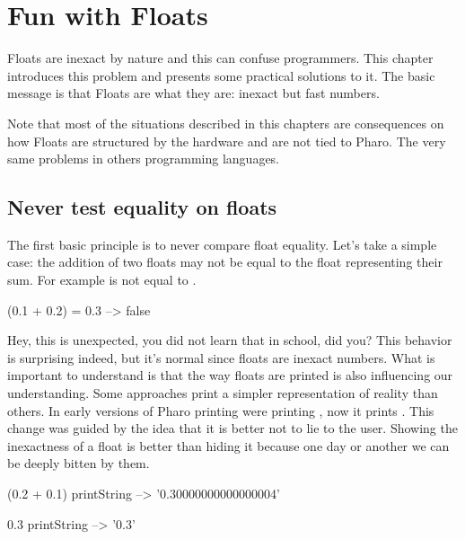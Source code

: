 \documentclass[a4paper,10pt,twoside]{book}
\begin{document}
\fi
\sloppy

\chapter{Fun with Floats}
\chapterauthor{\authornicolas{}}

Floats are inexact by nature and this can confuse programmers. This chapter introduces this problem and presents some practical solutions to it. The basic message is that Floats are what they are: inexact but fast numbers.

Note that most of the situations described in this chapters are consequences on how Floats are structured by the hardware and are not tied to Pharo. The very same problems in others programming languages.



\section{Never test equality on floats}
The first basic principle is to never compare float equality. 
Let's take a simple case: the addition of two floats may not be equal to the float representing their
sum. For example  is not equal to .

\begin{code}{}
(0.1 + 0.2) = 0.3
	--> false
\end{code}

Hey, this is unexpected, you did not learn that in school, did you? This behavior is surprising indeed, but it's normal since floats are inexact numbers. What is important to understand is that the way floats are printed is also influencing our understanding. Some approaches print a simpler representation of reality than others. In early versions of Pharo printing  were printing , now it prints .
This change was guided by the idea that it is better not to lie to the user. Showing the inexactness of a float is better than hiding it because one day or another we can be deeply bitten by them. 

\begin{code}{}
(0.2 + 0.1) printString
	--> '0.30000000000000004' 

0.3 printString
	-->	'0.3'
\end{code}	
\end{document}
